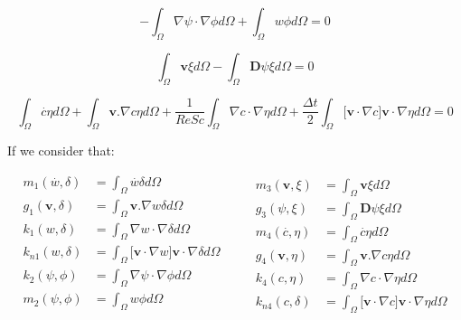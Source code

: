 \begin{equation}
 - \int_{\Omega} \nabla \psi \cdot \nabla \phi d\Omega
 + \int_{\Omega} w \phi d\Omega = 0
\end{equation}

\begin{equation}
   \int_{\Omega} \textbf{v} \xi d\Omega
 - \int_{\Omega} \textbf{D}\psi \xi d\Omega = 0
\end{equation}

\begin{equation} \label{concentration weak}
   \int_{\Omega} \overset{.}{c} \eta d\Omega
 + \int_{\Omega} \textbf{v}.\nabla c \eta d\Omega
 + \frac{1}{\textit{ReSc}} \int_{\Omega} \nabla c \cdot \nabla \eta d\Omega 
 + \frac{\Delta t}{2} \int_{\Omega} \big[ \textbf{v} \cdot \nabla c \big] \textbf{v} \cdot \nabla \eta d\Omega
 = 0
\end{equation}

\medskip
\noindent
If we consider that:

\begin{equation}
 \begin{aligned}
  \textbf{$m_1$}(\overset{.}{w},\delta) & = \int_{\Omega} \overset{.}{w} \delta d\Omega \\ 
  \textbf{$g_1$}(\textbf{v},\delta) & = \int_{\Omega} \textbf{v}.\nabla w \delta d\Omega \\
  \textbf{$k_1$}(w,\delta) & = \int_{\Omega} \nabla w \cdot \nabla \delta d\Omega \\
  \textbf{$k_{n1}$}(w,\delta) & = \int_{\Omega} \big[ \textbf{v} \cdot \nabla w \big] \textbf{v} \cdot \nabla \delta d\Omega \\
  \textbf{$k_2$}(\psi,\phi) & = \int_{\Omega} \nabla \psi \cdot \nabla \phi d\Omega \\
  \textbf{$m_2$}(\psi,\phi) & = \int_{\Omega} w \phi d\Omega \\
 \end{aligned}
 \qquad
 \begin{aligned}  
  \textbf{$m_3$}(\textbf{v},\xi) & = \int_{\Omega} \textbf{v} \xi d\Omega \\
  \textbf{$g_3$}(\psi,\xi) & = \int_{\Omega} \textbf{D}\psi \xi d\Omega \\
  \textbf{$m_4$}(\overset{.}{c},\eta) & = \int_{\Omega} \overset{.}{c} \eta d\Omega \\
  \textbf{$g_4$}(\textbf{v},\eta) & = \int_{\Omega} \textbf{v}.\nabla c \eta d\Omega \\
  \textbf{$k_4$}(c,\eta) & = \int_{\Omega} \nabla c \cdot \nabla \eta d\Omega \\
  \textbf{$k_{n4}$}(c,\delta) & = \int_{\Omega} \big[ \textbf{v} \cdot \nabla c \big] \textbf{v} \cdot \nabla \eta d\Omega 
 \end{aligned}
\end{equation}

